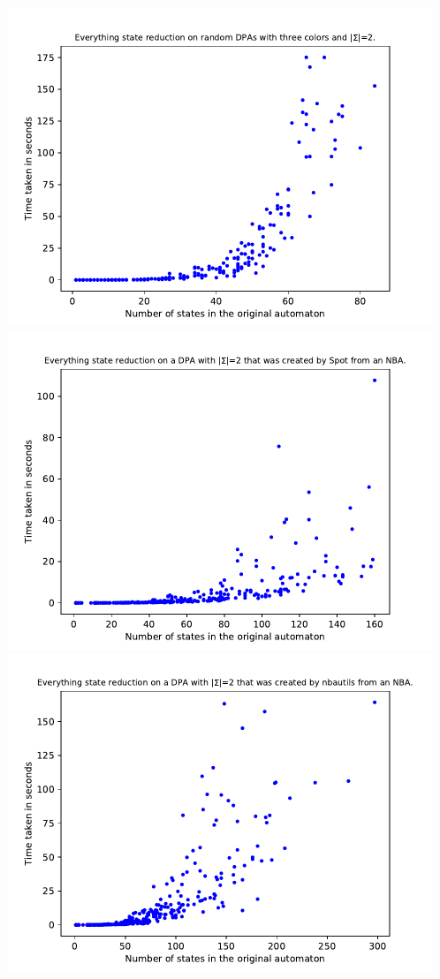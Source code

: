\begin{figure}
	\centering
	\begin{minipage}{0.49\textwidth}
		\includegraphics[page=6,height=.3\textheight]{../data/analysis/everything/gendet_ap1.pdf} 
		\includegraphics[page=6,height=.3\textheight]{../data/analysis/everything/detspot_ap1.pdf} 
		\includegraphics[page=6,height=.3\textheight]{../data/analysis/everything/detnbaut_ap1.pdf} 

\end{minipage}
\end{figure}

